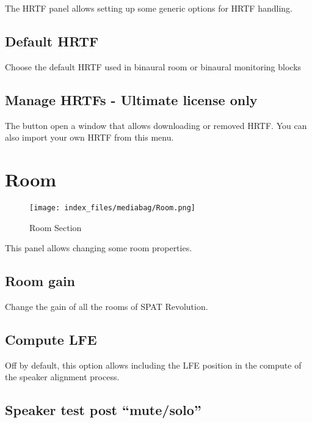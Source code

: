 \documentclass[
  letterpaper,
  DIV=11,
  numbers=noendperiod]{scrreport}
\begin{document}
The HRTF panel allows setting up some generic options for HRTF handling.

\hypertarget{default-hrtf}{%
\subsection{Default HRTF}\label{default-hrtf}}

Choose the default HRTF used in binaural room or binaural monitoring
blocks

\hypertarget{manage-hrtfs---ultimate-license-only}{%
\subsection{Manage HRTFs - Ultimate license
only}\label{manage-hrtfs---ultimate-license-only}}

The button open a window that allows downloading or removed HRTF. You
can also import your own HRTF from this menu.

\hypertarget{room-1}{%
\section{Room}\label{room-1}}

\begin{figure}

{\centering \texttt{[image: index\_files/mediabag/Room.png]}

}

\caption{Room Section}

\end{figure}

This panel allows changing some room properties.

\hypertarget{room-gain}{%
\subsection{Room gain}\label{room-gain}}

Change the gain of all the rooms of SPAT Revolution.

\hypertarget{compute-lfe}{%
\subsection{Compute LFE}\label{compute-lfe}}

Off by default, this option allows including the LFE position in the
compute of the speaker alignment process.

\hypertarget{speaker-test-post-mutesolo}{%
\subsection{Speaker test post
``mute/solo''}\label{speaker-test-post-mutesolo}}
\end{document}
